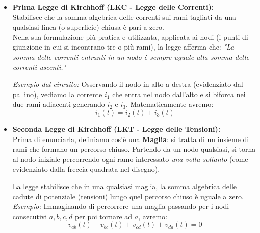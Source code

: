 \documentclass[12pt, a4paper]{article}
\begin{document}
	\begin{itemize}[label=\textcolor{titlecolor}{\Large\textbullet}, itemsep=8pt, parsep=2pt, leftmargin=1.5cm]
		\item \textbf{Prima Legge di Kirchhoff (LKC - Legge delle Correnti):}\\
		Stabilisce che la somma algebrica delle correnti sui rami tagliati da una qualsiasi linea (o superficie) chiusa è pari a zero. \\
		Nella sua formulazione più pratica e utilizzata, applicata ai nodi (i punti di giunzione in cui si incontrano tre o più rami), la legge afferma che: \textit{"La somma delle correnti entranti in un nodo è sempre uguale alla somma delle correnti uscenti."}
		
		\textit{Esempio dal circuito:} Osservando il nodo in alto a destra (evidenziato dal pallino), vediamo la corrente $i_1$ che entra nel nodo dall'alto e si biforca nei due rami adiacenti generando $i_2$ e $i_3$. Matematicamente avremo:
		\[
		i_1(t) = i_2(t) + i_3(t)
		\]
		
		\item \textbf{Seconda Legge di Kirchhoff (LKT - Legge delle Tensioni):}\\
		Prima di enunciarla, definiamo cos'è una \textbf{Maglia}: si tratta di un insieme di rami che formano un percorso chiuso. Partendo da un nodo qualsiasi, si torna al nodo iniziale percorrendo ogni ramo interessato \textit{una volta soltanto} (come evidenziato dalla freccia quadrata nel disegno).
		
		La legge stabilisce che in una qualsiasi maglia, la somma algebrica delle cadute di potenziale (tensioni) lungo quel percorso chiuso è uguale a zero. \\
		\textit{Esempio:} Immaginando di percorrere una maglia passando per i nodi consecutivi $a, b, c, d$ per poi tornare ad $a$, avremo:
		\[
		v_{ab}(t) + v_{bc}(t) + v_{cd}(t) + v_{da}(t) = 0
		\]
	\end{itemize}
	
\end{document}
